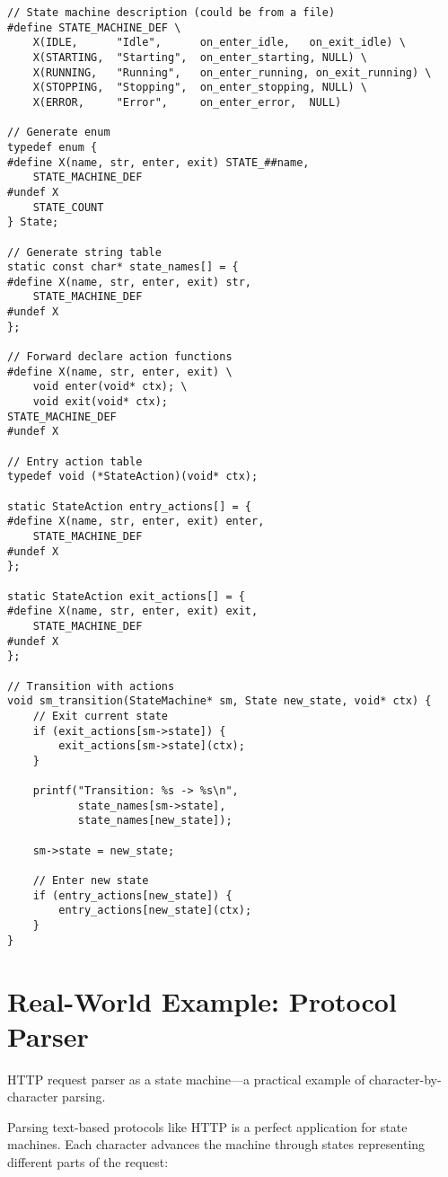 \begin{lstlisting}
// State machine description (could be from a file)
#define STATE_MACHINE_DEF \
    X(IDLE,      "Idle",      on_enter_idle,   on_exit_idle) \
    X(STARTING,  "Starting",  on_enter_starting, NULL) \
    X(RUNNING,   "Running",   on_enter_running, on_exit_running) \
    X(STOPPING,  "Stopping",  on_enter_stopping, NULL) \
    X(ERROR,     "Error",     on_enter_error,  NULL)

// Generate enum
typedef enum {
#define X(name, str, enter, exit) STATE_##name,
    STATE_MACHINE_DEF
#undef X
    STATE_COUNT
} State;

// Generate string table
static const char* state_names[] = {
#define X(name, str, enter, exit) str,
    STATE_MACHINE_DEF
#undef X
};

// Forward declare action functions
#define X(name, str, enter, exit) \
    void enter(void* ctx); \
    void exit(void* ctx);
STATE_MACHINE_DEF
#undef X

// Entry action table
typedef void (*StateAction)(void* ctx);

static StateAction entry_actions[] = {
#define X(name, str, enter, exit) enter,
    STATE_MACHINE_DEF
#undef X
};

static StateAction exit_actions[] = {
#define X(name, str, enter, exit) exit,
    STATE_MACHINE_DEF
#undef X
};

// Transition with actions
void sm_transition(StateMachine* sm, State new_state, void* ctx) {
    // Exit current state
    if (exit_actions[sm->state]) {
        exit_actions[sm->state](ctx);
    }

    printf("Transition: %s -> %s\n",
           state_names[sm->state],
           state_names[new_state]);

    sm->state = new_state;

    // Enter new state
    if (entry_actions[new_state]) {
        entry_actions[new_state](ctx);
    }
}
\end{lstlisting}

\section{Real-World Example: Protocol Parser}

HTTP request parser as a state machine—a practical example of character-by-character parsing.

Parsing text-based protocols like HTTP is a perfect application for state machines. Each character advances the machine through states representing different parts of the request:

